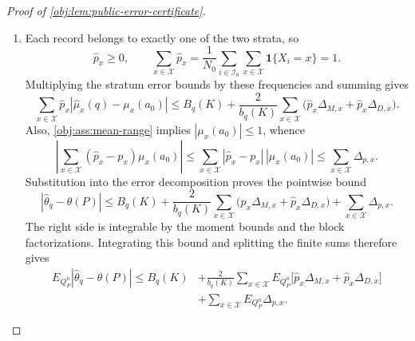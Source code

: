 \documentclass[11pt]{article}
\begin{document}
\begin{proof}[Proof of \cref{obj:lem:public-error-certificate}]
\begin{enumerate}
\item
Each record belongs to exactly one of the two strata, so
\[
\widehat p_x\ge0,
\qquad
\sum_{x\in\mathcal X}\widehat p_x
=\frac1{N_0}\sum_{i\in\mathcal I_0}
       \sum_{x\in\mathcal X}\mathbf1\{X_i=x\}
=1.
\]
Multiplying the stratum error bounds by these frequencies and summing
gives
\[
\sum_{x\in\mathcal X}\widehat p_x
       |\widehat\mu_x(q)-\mu_x(a_0)|
\le
B_q(K)+\frac2{b_q(K)}\sum_{x\in\mathcal X}
       \bigl(\widehat p_x\Delta_{M,x}
             +\widehat p_x\Delta_{D,x}\bigr).
\]
Also, \cref{obj:ass:mean-range} implies
\(|\mu_x(a_0)|\le1\), whence
\[
\left|\sum_{x\in\mathcal X}(\widehat p_x-p_x)\mu_x(a_0)\right|
\le\sum_{x\in\mathcal X}|\widehat p_x-p_x|\,|\mu_x(a_0)|
\le\sum_{x\in\mathcal X}\Delta_{p,x}.
\]
Substitution into the error decomposition proves the pointwise bound
\[
|\widehat\theta_q-\theta(P)|
\le
B_q(K)+\frac2{b_q(K)}\sum_{x\in\mathcal X}
       \bigl(\widehat p_x\Delta_{M,x}
             +\widehat p_x\Delta_{D,x}\bigr)
+\sum_{x\in\mathcal X}\Delta_{p,x}.
\]
The right side is integrable by the moment bounds and the block
factorizations. Integrating this bound and splitting the finite sums
therefore gives
\[
\begin{aligned}
E_{Q_P^n}|\widehat\theta_q-\theta(P)|
\le B_q(K)
&+\frac2{b_q(K)}\sum_{x\in\mathcal X}
 E_{Q_P^n}\bigl[\widehat p_x\Delta_{M,x}
                  +\widehat p_x\Delta_{D,x}\bigr]\\
&+\sum_{x\in\mathcal X}E_{Q_P^n}\Delta_{p,x}.
\end{aligned}
\]


\end{enumerate}
\end{proof}
\end{document}
